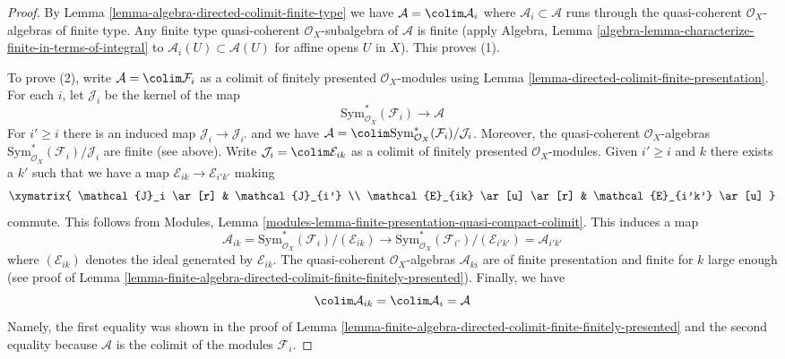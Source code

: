 \begin{proof}
By Lemma \ref{lemma-algebra-directed-colimit-finite-type} we have
$\mathcal{A} = \colim \mathcal{A}_i$ where
$\mathcal{A}_i \subset \mathcal{A}$ runs through the
quasi-coherent $\mathcal{O}_X$-algebras of finite type.
Any finite type quasi-coherent $\mathcal{O}_X$-subalgebra
of $\mathcal{A}$ is finite (apply Algebra, Lemma
\ref{algebra-lemma-characterize-finite-in-terms-of-integral}
to $\mathcal{A}_i(U) \subset \mathcal{A}(U)$ for affine opens $U$
in $X$). This proves (1).

\medskip\noindent
To prove (2), write $\mathcal{A} = \colim \mathcal{F}_i$
as a colimit of finitely presented $\mathcal{O}_X$-modules using
Lemma \ref{lemma-directed-colimit-finite-presentation}.
For each $i$, let $\mathcal{J}_i$ be the kernel of the map
$$
\text{Sym}^*_{\mathcal{O}_X}(\mathcal{F}_i) \longrightarrow \mathcal{A}
$$
For $i' \geq i$ there is an induced map $\mathcal{J}_i \to \mathcal{J}_{i'}$
and we have $\mathcal{A} =
\colim \text{Sym}^*_{\mathcal{O}_X}(\mathcal{F}_i)/\mathcal{J}_i$.
Moreover, the quasi-coherent $\mathcal{O}_X$-algebras
$\text{Sym}^*_{\mathcal{O}_X}(\mathcal{F}_i)/\mathcal{J}_i$
are finite (see above). Write $\mathcal{J}_i = \colim \mathcal{E}_{ik}$
as a colimit of finitely presented $\mathcal{O}_X$-modules.
Given $i' \geq i$ and $k$ there exists a $k'$ such that we
have a map $\mathcal{E}_{ik} \to \mathcal{E}_{i'k'}$
making
$$
\xymatrix{
\mathcal{J}_i \ar[r] & \mathcal{J}_{i'} \\
\mathcal{E}_{ik} \ar[u] \ar[r] & \mathcal{E}_{i'k'} \ar[u]
}
$$
commute. This follows from
Modules, Lemma \ref{modules-lemma-finite-presentation-quasi-compact-colimit}.
This induces a map
$$
\mathcal{A}_{ik} =
\text{Sym}^*_{\mathcal{O}_X}(\mathcal{F}_i)/(\mathcal{E}_{ik})
\longrightarrow
\text{Sym}^*_{\mathcal{O}_X}(\mathcal{F}_{i'})/(\mathcal{E}_{i'k'}) =
\mathcal{A}_{i'k'}
$$
where $(\mathcal{E}_{ik})$ denotes the ideal generated by $\mathcal{E}_{ik}$.
The quasi-coherent $\mathcal{O}_X$-algebras $\mathcal{A}_{ki}$
are of finite presentation and finite for $k$ large enough
(see proof of
Lemma \ref{lemma-finite-algebra-directed-colimit-finite-finitely-presented}).
Finally, we have
$$
\colim \mathcal{A}_{ik} = \colim \mathcal{A}_i = \mathcal{A}
$$
Namely, the first equality was shown in the proof of
Lemma \ref{lemma-finite-algebra-directed-colimit-finite-finitely-presented}
and the second equality because $\mathcal{A}$ is the colimit of
the modules $\mathcal{F}_i$.
\end{proof}






